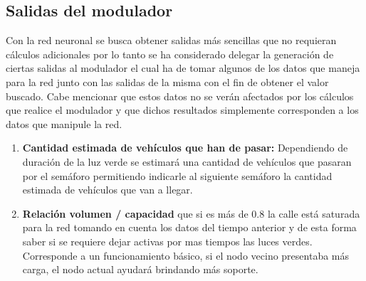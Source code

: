 \subsection{Salidas del modulador}
Con la red neuronal se busca obtener salidas m\'{a}s sencillas que no requieran c\'{a}lculos adicionales por lo tanto se ha considerado delegar la generaci\'{o}n de ciertas salidas al modulador el cual ha de tomar algunos de los datos que maneja para la red junto con las salidas de la misma con el fin de obtener el valor buscado. Cabe mencionar que estos datos no se ver\'{a}n afectados por los c\'{a}lculos que realice el modulador y que dichos resultados simplemente corresponden a los datos que manipule la red.

\begin{enumerate}
	\item \textbf{Cantidad estimada de veh\'{i}culos que han de pasar:} Dependiendo de duraci\'{o}n de la luz verde se estimar\'{a} una cantidad de veh\'{i}culos que pasaran por el sem\'{a}foro permitiendo indicarle al siguiente sem\'{a}foro la cantidad estimada de veh\'{i}culos que van a llegar.

	\item \textbf{Relaci\'{o}n volumen / capacidad} que si es m\'{a}s de 0.8 la calle est\'{a} saturada para la red tomando en cuenta los datos del tiempo anterior y de esta forma saber si se requiere dejar activas por mas tiempos las luces verdes. Corresponde a un funcionamiento b\'{a}sico, si el nodo vecino presentaba m\'{a}s carga, el nodo actual ayudar\'{a} brindando m\'{a}s soporte.
	
\end{enumerate}
